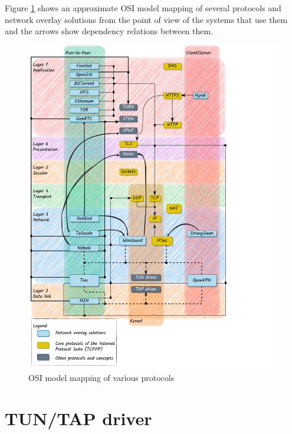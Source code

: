 Figure \ref{osi-map-overlays} shows an approximate OSI model mapping of
several protocols and network overlay solutions from the point of view
of the systems that use them and the arrows show dependency relations
between them.

\begin{figure}
\centering
\includegraphics[width=\textwidth,height=0.9\textheight]{thesis/../figures/osi-map-overlays.drawio.pdf}
\caption{OSI model mapping of various protocols
\label{osi-map-overlays}}
\end{figure}

\hypertarget{tuntap-driver}{%
\section{TUN/TAP driver}\label{tuntap-driver}}

